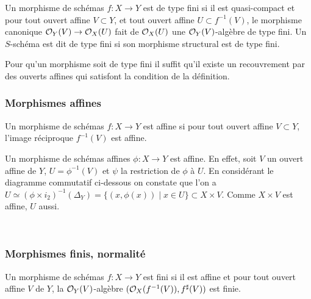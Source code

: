 \begin{defn}
Un morphisme de schémas $f:X\rightarrow Y$ est de type fini si il est quasi-compact et pour tout ouvert affine $V\subset Y$, et tout ouvert affine $U\subset f^{-1}(V)$, le morphisme canonique $\mathcal{O}_Y(V)\rightarrow \mathcal{O}_X(U)$ fait de $\mathcal{O}_X(U)$ une $\mathcal{O}_Y(V)$-algèbre de type fini. Un $S$-schéma est dit de type fini si son morphisme structural est de type fini.
\end{defn}

\begin{rem}
Pour qu'un morphisme soit de type fini il suffit qu'il existe un recouvrement par des ouverts affines qui satisfont la condition de la définition.
\end{rem}

\subsubsection{Morphismes affines}

\begin{defn}
Un morphisme de schémas $f:X\rightarrow Y$ est affine si pour tout ouvert affine $V\subset Y$, l'image réciproque $f^{-1}(V)$ est affine.
\end{defn}

\begin{ex}\label{exaff}
Un morphisme de schémas affines $\phi: X\rightarrow Y$ est affine. En effet, soit $V$ un ouvert affine de $Y$, $U=\phi^{-1}(V)$ et $\psi$ la restriction de $\phi$ à $U$. En considérant le diagramme commutatif ci-dessous on constate que l'on a $U \simeq (\phi\times i_2)^{-1}(\Delta_Y)=\lbrace (x,\phi(x))\mid x\in U \rbrace \subset X\times V$. Comme $X\times V$ est affine, $U$ aussi.
	\begin{center}
	\\
	\end{center}
\end{ex}


\subsubsection{Morphismes finis, normalité}

\begin{defn}
Un morphisme de schémas $f:X\rightarrow Y$ est fini si il est affine et pour tout ouvert affine $V$ de $Y$, la $\mathcal{O}_Y(V)$-algèbre $(\mathcal{O}_X(f^{-1}(V)), f^\sharp(V))$ est finie.
\end{defn}

